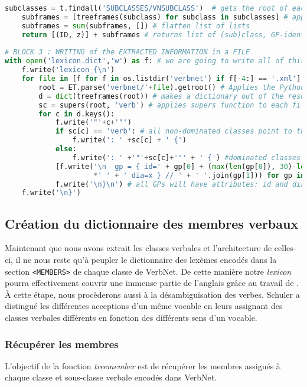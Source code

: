 \begin{lstlisting}[language=Python, caption = Importation de l'architecture des classes verbales, label=fig:archivn]
    subclasses = t.findall('SUBCLASSES/VNSUBCLASS')  # gets the root of each subclasses
    subframes = [treeframes(subclass) for subclass in subclasses] # applies function to subclasses
    subframes = sum(subframes, []) # flatten list of lists
    return [(ID, z)] + subframes # returns list of (sub)class, GP-identification and example
		
# BLOCK 3 : WRITING of the EXTRACTED INFORMATION in a FILE
with open('lexicon.dict','w') as f: # we are going to write all of this block into lexicon.dict
    f.write('lexicon {\n')
    for file in [f for f in os.listdir('verbnet') if f[-4:] == '.xml']: # open VerbNet XMl files
        root = ET.parse('verbnet/'+file).getroot() # Applies the Python Element Tree module
        d = dict(treeframes(root)) # makes a dictionary out of the results of treeframes on a file
        sc = supers(root, 'verb') # applies supers function to each file
        for c in d.keys():
            f.write('"'+c+'"')
            if sc[c] == 'verb': # all non-dominated classes point to the default verb class
                f.write(': ' +sc[c] + ' {') 
            else:
                f.write(': ' +'"'+sc[c]+'"' + ' {') #dominated classes point towards their governor
            [f.write('\n  gp = { id=' + gp[0] + (max(len(gp[0]), 30)-len(gp[0]))
                     *' ' + ' dia=x } // ' + ' '.join(gp[1])) for gp in d[c]]
            f.write('\n}\n') # all GPs will have attributes: id and dia
    f.write('\n}')
\end{lstlisting}

\subsection{Création du dictionnaire des membres verbaux} \label{extracmembre}

Maintenant que nous avons extrait les classes verbales et l'architecture de celles-ci, il ne nous reste qu'à peupler le dictionnaire des lexèmes encodés dans la section \texttt{<MEMBERS>} de chaque classe de VerbNet. De cette manière notre \emph{lexicon} pourra effectivement couvrir une immense partie de l'anglais grâce au travail de \cite{SchulerVerbnetBroadcoverageComprehensive2005}. À cette étape, nous procèderons aussi à la désambiguïsation des verbes. Schuler a distingué les différentes acceptions d'un même vocable en leurs assignant des classes verbales différents en fonction des différents sens d'un vocable.

\subsubsection{Récupérer les membres}
L'objectif de la fonction \emph{treemember} est de récupérer les membres assignés à chaque classe et sous-classe verbale encodés dans VerbNet.

